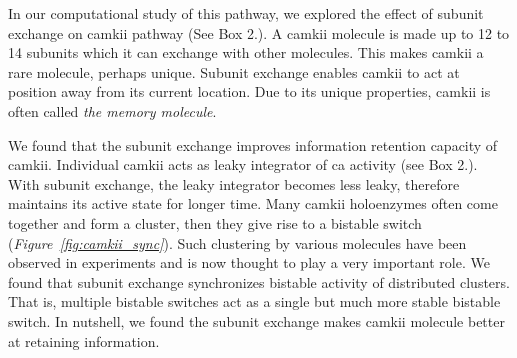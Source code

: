\documentclass[]{resonance}
\newcommand\Fig[1]{\textit{Figure~\ref{#1}}}
\begin{document}

In our computational study of this pathway, we explored the effect of subunit
exchange on \gls{camkii} pathway \cite{SinghAndBhalla2018} (See Box 2.). A
\gls{camkii} molecule is made up to 12 to 14 subunits which it can exchange with
other molecules. This makes \gls{camkii} a rare molecule, perhaps unique.
Subunit exchange enables \gls{camkii} to act at position away from its current
location. Due to its unique properties, \gls{camkii} is often called \emph{the
memory molecule}.

We found that the subunit exchange improves information retention capacity of
\gls{camkii}. Individual \gls{camkii} acts as leaky integrator of \gls{ca}
activity (see Box 2.). With subunit exchange, the leaky integrator becomes less
leaky, therefore maintains its active state for longer time.  Many \gls{camkii}
holoenzymes often come together and form a cluster, then they give rise to a
bistable switch (\Fig{fig:camkii_sync}). Such clustering by various molecules
have been observed in experiments and is now thought to play a very important
role. We found that subunit exchange synchronizes bistable activity of
distributed clusters. That is, multiple bistable switches act as a single but
much more stable bistable switch. In nutshell, we found the subunit exchange
makes \gls{camkii} molecule better at retaining information.
\end{document}
